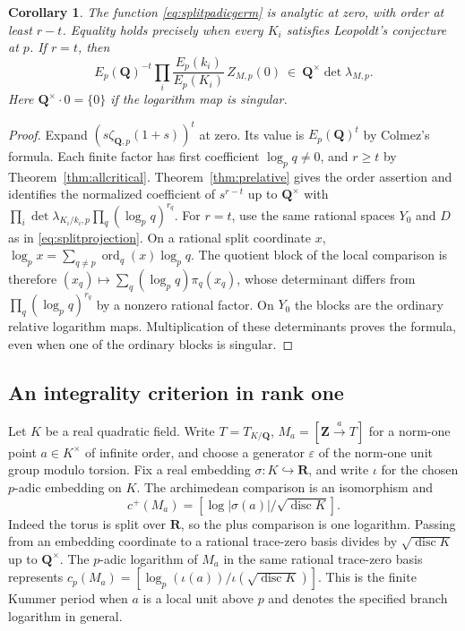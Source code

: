 \documentclass[11pt]{amsart}
\numberwithin{equation}{section}
\newtheorem{corollary}[theorem]{Corollary}
\theoremstyle{definition}
\theoremstyle{remark}
\newcommand{\Q}{\mathbf Q}
\newcommand{\Z}{\mathbf Z}
\newcommand{\R}{\mathbf R}
\newcommand{\ord}{\operatorname{ord}}
\begin{document}
\begin{corollary}\label{cor:splitpadic}
The function \eqref{eq:splitpadicgerm} is analytic at zero, with
order at least $r-t$. Equality holds precisely when every $K_i$
satisfies Leopoldt's conjecture at $p$. If $r=t$, then
\[
 E_p(\Q)^{-t}\prod_i\frac{E_p(k_i)}{E_p(K_i)}\, Z_{M,p}(0)
       \ \in\ \Q^\times\det\lambda_{M,p}.
\]
Here $\Q^\times\cdot0=\{0\}$ if the logarithm map is singular.
\end{corollary}

\begin{proof}
Expand $(s\zeta_{\Q,p}(1+s))^t$ at zero. Its value is
$E_p(\Q)^t$ by Colmez's formula. Each finite factor has first
coefficient $\log_p q\ne0$, and $r\ge t$ by
Theorem~\ref{thm:allcritical}. Theorem~\ref{thm:prelative}
gives the order assertion and identifies the normalized coefficient
of $s^{r-t}$ up to $\Q^\times$ with
$\prod_i\det\lambda_{K_i/k_i,p}\prod_q(\log_p q)^{r_q}$.
For $r=t$, use the same rational spaces $Y_0$ and $D$ as in
\eqref{eq:splitprojection}. On a rational split coordinate $x$,
$\log_p x=\sum_{q\ne p}\ord_q(x)\log_p q$. The quotient block of
the local comparison is therefore $(x_q)\mapsto\sum_q(\log_p q)
\pi_q(x_q)$, whose determinant differs from $\prod_q(\log_p q)^{r_q}$
by a nonzero rational factor. On $Y_0$ the blocks are the ordinary
relative logarithm maps. Multiplication of these determinants proves
the formula, even when one of the ordinary blocks is singular.
\end{proof}

\subsection{An integrality criterion in rank one}

Let $K$ be a real quadratic field. Write $T=T_{K/\Q}$,
$M_a=[\Z\xrightarrow{a}T]$ for a norm-one point
$a\in K^\times$ of infinite order, and choose a generator
$\varepsilon$ of the norm-one unit group modulo torsion.
Fix a real embedding $\sigma:K\hookrightarrow\R$, and
write $\iota$ for the chosen $p$-adic embedding on $K$.
The archimedean comparison is an isomorphism and
\[
 c^+(M_a)=\left[\log|\sigma(a)|/\sqrt{\operatorname{disc}K}\right].
\]
Indeed the torus is split over $\R$, so the plus
comparison is one logarithm. Passing from an
embedding coordinate to a rational trace-zero basis
divides by $\sqrt{\operatorname{disc}K}$ up to $\Q^\times$.
The $p$-adic logarithm of $M_a$ in the same rational
trace-zero basis represents
$c_p(M_a)= [\log_p(\iota(a))/\iota(\sqrt{\operatorname{disc}K})]$.
This is the finite Kummer period when $a$ is a local unit
above $p$ and denotes the specified branch logarithm in general.
\end{document}
